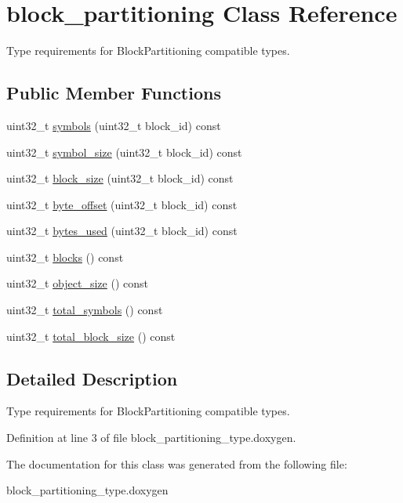 \hypertarget{classblock__partitioning}{\section{block\-\_\-partitioning Class Reference}
\label{classblock__partitioning}
}


Type requirements for Block\-Partitioning compatible types.  


\subsection*{Public Member Functions}
\begin{DoxyCompactItemize}
\item 
uint32\-\_\-t \hyperlink{group__block__partitioning__type_ga8bad04de0de93d2937892dfc75cb4465}{symbols} (uint32\-\_\-t block\-\_\-id) const 
\item 
uint32\-\_\-t \hyperlink{group__block__partitioning__type_ga98b54a11fb75aaab47e104e342db52e5}{symbol\-\_\-size} (uint32\-\_\-t block\-\_\-id) const 
\item 
uint32\-\_\-t \hyperlink{group__block__partitioning__type_ga972a80824c7d9c2340414900c2898e5e}{block\-\_\-size} (uint32\-\_\-t block\-\_\-id) const 
\item 
uint32\-\_\-t \hyperlink{group__block__partitioning__type_ga8ab6e90864470444f980462a50831105}{byte\-\_\-offset} (uint32\-\_\-t block\-\_\-id) const 
\item 
uint32\-\_\-t \hyperlink{group__block__partitioning__type_ga89f380a37306e2bd05c5648963e3f09d}{bytes\-\_\-used} (uint32\-\_\-t block\-\_\-id) const 
\item 
uint32\-\_\-t \hyperlink{group__block__partitioning__type_gaccea252dec8d637d64012a42cdcfc5c4}{blocks} () const 
\item 
uint32\-\_\-t \hyperlink{group__block__partitioning__type_gadfffb4576c325b7fafcbc2dd0a86062d}{object\-\_\-size} () const 
\item 
uint32\-\_\-t \hyperlink{group__block__partitioning__type_ga7e980680a5412664bb2e389a6ee87113}{total\-\_\-symbols} () const 
\item 
uint32\-\_\-t \hyperlink{group__block__partitioning__type_gafaeb4618690bbff82f8b13c87bb733ca}{total\-\_\-block\-\_\-size} () const 
\end{DoxyCompactItemize}


\subsection{Detailed Description}
Type requirements for Block\-Partitioning compatible types. 

Definition at line 3 of file block\-\_\-partitioning\-\_\-type.\-doxygen.



The documentation for this class was generated from the following file\-:\begin{DoxyCompactItemize}
\item 
block\-\_\-partitioning\-\_\-type.\-doxygen\end{DoxyCompactItemize}
